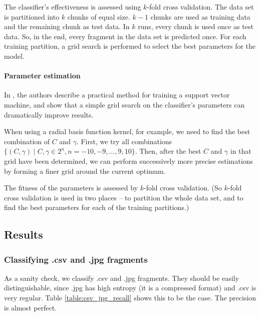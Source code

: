 The classifier's effectiveness is assessed using $k$-fold cross
validation. The data set is partitioned into $k$ chunks of equal size. $k
- 1$ chunks are used as training data and the remaining chunk as test
data. In $k$ runs, every chunk is used once as test data. So, in the end,
every fragment in the data set is predicted once. For each training
partition, a grid search is performed to select the best parameters for
the model.


\paragraph{Parameter estimation}

In \cite{Chih2008}, the authors describe a practical method for training
a support vector machine, and show that a simple grid search on the
classifier's parameters can dramatically improve results.

When using a radial basis function kernel, for example, we need to find
the best combination of $C$ and $\gamma$. First, we try all combinations
$ \{ (C, \gamma) \mid C, \gamma \in 2^{n}, n = -10, -9, \dots, 9, 10 \}$.
Then, after the best $C$ and $\gamma$ in that grid have been determined,
we can perform successively more precise estimations by forming a finer
grid around the current optimum.

The fitness of the parameters is assessed by $k$-fold cross validation.
(So $k$-fold cross validation is used in two places -- to partition
the whole data set, and to find the best parameters for each of the
training partitions.)

\subsection{Results}

\subsubsection{Classifying .csv and .jpg fragments}

As a sanity check, we classify .csv and .jpg fragments. They should be
easily distinguishable, since .jpg has high entropy (it is a compressed
format) and .csv is very regular. Table \ref{table:csv_jpg_recall} shows
this to be the case. The precision is almost perfect.

